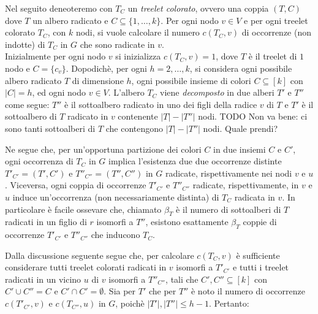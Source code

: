 Nel seguito deneoteremo con $ T_C $ un \emph{treelet colorato}, ovvero una coppia $ (T,C) $ dove $ T $ un albero radicato e $ C \subseteq \{1,\dots,k\}$.
Per ogni nodo $ v \in V $ e per ogni treelet colorato $ T_C $, con $ k $ nodi, si vuole calcolare il numero $ c(T_C , v) $ di occorrenze (non indotte) di $ T_C $  in $ G $ che sono radicate in $v$.\\
Inizialmente per ogni nodo $ v $ si inizializza $ c(T_C , v) = 1 $, dove $T$ \`e il treelet di $1$ nodo e $ C = \{c_v\}$.
Dopodichè, per ogni $ h = 2,\dots,k $,  si considera ogni possibile albero radicato $T$ di dimensione $ h $, ogni possibile insieme di colori $ C \subseteq [k] $ con $ |C| = h $, ed ogni nodo $v \in V$.
L'albero $T_C$ viene \emph{decomposto} in due alberi $T'$ e $T''$
come segue: $ T'' $ \`e il sottoalbero radicato in uno dei figli della radice $ v $ di $ T $ e $ T' $ \`e il sottoalbero di $ T $ radicato in $ v $ contenente $ |T| - |T''| $ nodi.
TODO Non va bene: ci sono tanti sottoalberi di $T$ che contengono $ |T| - |T''| $ nodi. Quale prendi?

Ne segue che, per un'opportuna partizione dei colori $C$ in due insiemi $C$ e $C'$, ogni occorrenza di $T_C$ in $G$ implica l'esistenza due due occorrenze distinte $T'_{C'} = (T', C')$ e $T''_{C''} = (T'', C'')$  in $G$ radicate, rispettivamente nei nodi $v$ e $u$.
Viceversa, ogni coppia di occorrenze $T'_{C'}$ e $T''_{C''}$ radicate, rispettivamente, in $v$ e $u$ induce un'occorrenza (non necessariamente distinta) di $T_C$ radicata in $v$.
In particolare è facile ossevare che, chiamato $\beta_T$ è il numero di sottoalberi di $T$ radicati in un figlio di $r$ isomorfi a $T''$, esistono esattamente $\beta_T$ coppie di occorrenze $T'_{C'}$ e $T''_{C''}$ che inducono $T_C$. 

Dalla discussione seguente segue che, per calcolare $ c(T_C,v)$ è sufficiente considerare tutti treelet colorati radicati in $ v $ isomorfi a $ T'_{C'} $ e tutti i  treelet radicati in un vicino $ u $ di $v$ isomorfi a $ T''_{C''} $, tali che $ C',C'' \subseteq [k] $ con  $C' \cup C'' = C$ e $C' \cap C' = \emptyset$. %
Sia per $ T' $ che per $ T'' $ \`e noto il numero di occorrenze $ c(T'_{C'},v) $ e $ c(T_{C''},u) $ in $ G $, poich\`e $|T'|, |T''| \le h-1$. Pertanto:

